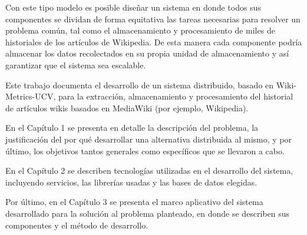 Con este tipo modelo es posible diseñar un sistema en donde todos sus componentes se dividan
de forma equitativa las tareas necesarias para resolver un problema común, tal como el almacenamiento y
procesamiento de miles de historiales de los artículos de Wikipedia. De esta manera cada componente podría
almacenar los datos recolectados en su propia unidad de almacenamiento y así garantizar que el sistema
sea escalable.

Este trabajo documenta el desarrollo de un sistema distribuido, basado en Wiki-Metrics-UCV,
para la extracción, almacenamiento y procesamiento del historial de artículos wikis basados en MediaWiki (por ejemplo, Wikipedia).

En el Capítulo 1 se presenta en detalle la descripción del problema, la justificación del por qué
desarrollar una alternativa distribuida al mismo, y por último, los objetivos tantos generales como
específicos que se llevaron a cabo.

En el Capítulo 2 se describen tecnologías utilizadas en el desarrollo del sistema, incluyendo servicios,
las librerías usadas y las bases de datos elegidas.

Por último, en el Capítulo 3 se presenta el marco aplicativo del sistema desarrollado para la solución al problema planteado,
en donde se describen sus componentes y el método de desarrollo.
